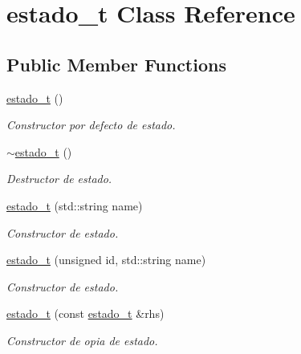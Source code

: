\hypertarget{classestado__t}{}\section{estado\+\_\+t Class Reference}
\label{classestado__t}
\subsection*{Public Member Functions}
\begin{DoxyCompactItemize}
\item 
\mbox{\label{classestado__t_a8e45cb6ecaf97bb8e9a33f82151f9323}} 
\hyperlink{classestado__t_a8e45cb6ecaf97bb8e9a33f82151f9323}{estado\+\_\+t} ()
\begin{DoxyCompactList}\small\item\em Constructor por defecto de estado. \end{DoxyCompactList}\item 
\mbox{\label{classestado__t_a6d790690691a79a2d56c327e31961046}} 
\hyperlink{classestado__t_a6d790690691a79a2d56c327e31961046}{$\sim$estado\+\_\+t} ()
\begin{DoxyCompactList}\small\item\em Destructor de estado. \end{DoxyCompactList}\item 
\hyperlink{classestado__t_a3f5cdd06d18afb8c21c18134a2ef7d84}{estado\+\_\+t} (std\+::string name)
\begin{DoxyCompactList}\small\item\em Constructor de estado. \end{DoxyCompactList}\item 
\hyperlink{classestado__t_aafc259bc6968f50e891da9ce4e3cf41d}{estado\+\_\+t} (unsigned id, std\+::string name)
\begin{DoxyCompactList}\small\item\em Constructor de estado. \end{DoxyCompactList}\item 
\hyperlink{classestado__t_aae570f94727aefd44cc17b4f06575ed7}{estado\+\_\+t} (const \hyperlink{classestado__t}{estado\+\_\+t} \&rhs)
\begin{DoxyCompactList}\small\item\em Constructor de opia de estado. \end{DoxyCompactList}\item 

\end{DoxyCompactItemize}
